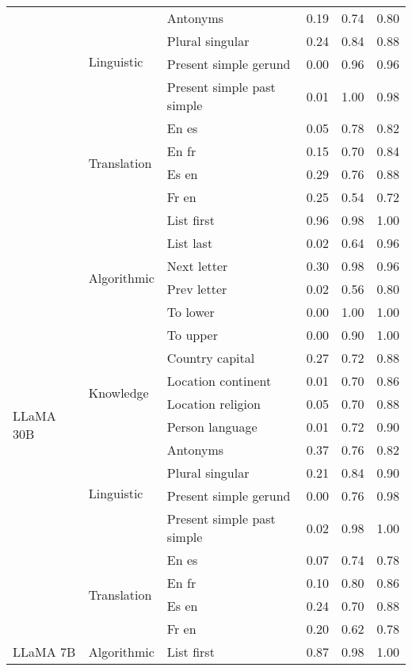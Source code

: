 \begin{center}
\begin{longtable}{lllrrr}
\cline{2-6}
 & \multirow[t]{4}{*}{Linguistic} & Antonyms & 0.19 & 0.74 & 0.80 \\
 &  & Plural singular & 0.24 & 0.84 & 0.88 \\
 &  & Present simple gerund & 0.00 & 0.96 & 0.96 \\
 &  & Present simple past simple & 0.01 & 1.00 & 0.98 \\
\cline{2-6}
 & \multirow[t]{4}{*}{Translation} & En es & 0.05 & 0.78 & 0.82 \\
 &  & En fr & 0.15 & 0.70 & 0.84 \\
 &  & Es en & 0.29 & 0.76 & 0.88 \\
 &  & Fr en & 0.25 & 0.54 & 0.72 \\
\cline{1-6} \cline{2-6}
\multirow[t]{18}{*}{LLaMA 30B} & \multirow[t]{6}{*}{Algorithmic} & List first & 0.96 & 0.98 & 1.00 \\
 &  & List last & 0.02 & 0.64 & 0.96 \\
 &  & Next letter & 0.30 & 0.98 & 0.96 \\
 &  & Prev letter & 0.02 & 0.56 & 0.80 \\
 &  & To lower & 0.00 & 1.00 & 1.00 \\
 &  & To upper & 0.00 & 0.90 & 1.00 \\
\cline{2-6}
 & \multirow[t]{4}{*}{Knowledge} & Country capital & 0.27 & 0.72 & 0.88 \\
 &  & Location continent & 0.01 & 0.70 & 0.86 \\
 &  & Location religion & 0.05 & 0.70 & 0.88 \\
 &  & Person language & 0.01 & 0.72 & 0.90 \\
\cline{2-6}
 & \multirow[t]{4}{*}{Linguistic} & Antonyms & 0.37 & 0.76 & 0.82 \\
 &  & Plural singular & 0.21 & 0.84 & 0.90 \\
 &  & Present simple gerund & 0.00 & 0.76 & 0.98 \\
 &  & Present simple past simple & 0.02 & 0.98 & 1.00 \\
\cline{2-6}
 & \multirow[t]{4}{*}{Translation} & En es & 0.07 & 0.74 & 0.78 \\
 &  & En fr & 0.10 & 0.80 & 0.86 \\
 &  & Es en & 0.24 & 0.70 & 0.88 \\
 &  & Fr en & 0.20 & 0.62 & 0.78 \\
\cline{1-6} \cline{2-6}
\multirow[t]{18}{*}{LLaMA 7B} & \multirow[t]{6}{*}{Algorithmic} & List first & 0.87 & 0.98 & 1.00 \\

\end{longtable}
\end{center}
